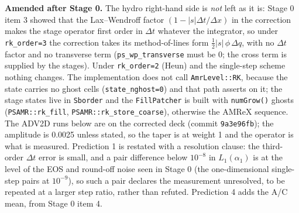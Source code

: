 \documentclass[11pt,a4paper]{article}
\newcommand{\code}[1]{\texttt{\small #1}}
\begin{document}
\textbf{Amended after Stage 0.}  The hydro right-hand side is \emph{not}
left as it is: Stage 0 item 3 showed that the Lax--Wendroff factor
$(1 - |s|\Delta t/\Delta x)$ in the correction makes the stage operator
first order in $\Delta t$ whatever the integrator, so under
\code{rk\_order=3} the correction takes its method-of-lines form
$\tfrac12|s|\,\phi\,\Delta q$, with no $\Delta t$ factor and no
transverse term (\code{ps\_wp\_transverse} must be 0; the cross term
is supplied by the stages).  Under \code{rk\_order=2} (Heun) and the
single-step scheme nothing changes.  The implementation does not call
\code{AmrLevel::RK}, because the state carries no ghost cells
(\code{state\_nghost=0}) and that path asserts on it; the stage states
live in \code{Sborder} and the \code{FillPatcher} is built with
\code{numGrow()} ghosts (\code{PSAMR::rk\_fill},
\code{PSAMR::rk\_store\_coarse}), otherwise the AMReX sequence.  The
ADV2D runs below are on the corrected deck (commit \code{9a3e96fb}); the
amplitude is 0.0025 unless stated, so the taper is at weight 1 and the
operator is what is measured.  Prediction 1 is restated with a resolution
clause: the third-order $\Delta t$ error is small, and a pair difference
below $10^{-8}$ in $L_1(\alpha_1)$ is at the level of the EOS and
round-off noise seen in Stage 0 (the one-dimensional single-step pairs at
$10^{-9}$), so such a pair declares the measurement unresolved, to be
repeated at a larger step ratio, rather than refuted.  Prediction 4 adds
the A/C mean, from Stage 0 item 4.
\end{document}
